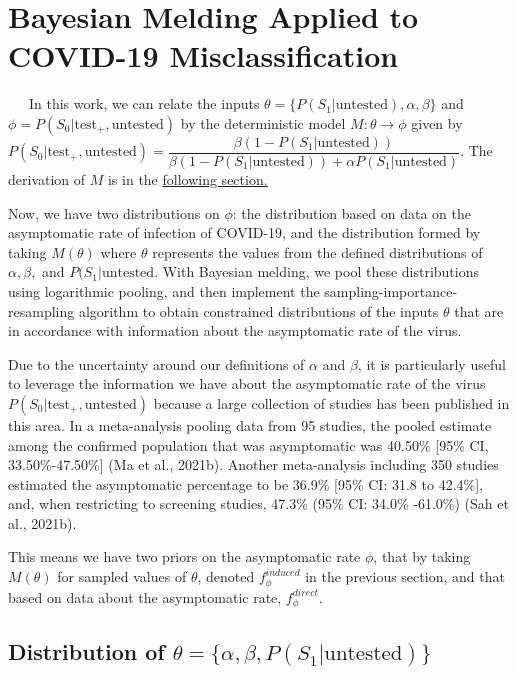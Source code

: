 \documentclass[12pt,twoside]{smiththesis}
\begin{document}
\hypertarget{meld}{%
\section{Bayesian Melding Applied to COVID-19 Misclassification}\label{meld}}

~~~In this work, we can relate the inputs \(\theta = \{P(S_1|\text{untested}), \alpha, \beta \}\) and \(\phi = P(S_0|\text{test}_+,\text{untested})\) by the deterministic model \(M: \theta \to \phi\) given by \(P(S_0|\text{test}_+, \text{untested}) = \dfrac{\beta(1 - P(S_1|\text{untested}))}{\beta(1-P(S_1|\text{untested})) + \alpha P(S_1|\text{untested})}.\) The derivation of \(M\) is in the \protect\hyperlink{derivation}{following section.}

Now, we have two distributions on \(\phi\): the distribution based on data on the asymptomatic rate of infection of COVID-19, and the distribution formed by taking \(M(\theta)\) where \(\theta\) represents the values from the defined distributions of \(\alpha,\beta,\) and \(P(S_1|\text{untested}\). With Bayesian melding, we pool these distributions using logarithmic pooling, and then implement the sampling-importance-resampling algorithm to obtain constrained distributions of the inputs \(\theta\) that are in accordance with information about the asymptomatic rate of the virus.

Due to the uncertainty around our definitions of \(\alpha\) and \(\beta\), it is particularly useful to leverage the information we have about the asymptomatic rate of the virus \(P(S_0|\text{test}_+,\text{untested})\) because a large collection of studies has been published in this area. In a meta-analysis pooling data from 95 studies, the pooled estimate among the confirmed population that was asymptomatic was 40.50\% {[}95\% CI, 33.50\%-47.50\%{]} (Ma et al., 2021b). Another meta-analysis including 350 studies estimated the asymptomatic percentage to be 36.9\% {[}95\% CI: 31.8 to 42.4\%{]}, and, when restricting to screening studies, 47.3\% (95\% CI: 34.0\% -61.0\%) (Sah et al., 2021b).

This means we have two priors on the asymptomatic rate \(\phi\), that by taking \(M(\theta)\) for sampled values of \(\theta\), denoted \(f_\phi^{induced}\) in the previous section, and that based on data about the asymptomatic rate, \(f_\phi^{direct}\).

\newpage

\hypertarget{distribution-of-theta-alpha-beta-ps_1textuntested}{%
\subsection{\texorpdfstring{Distribution of \(\theta = \{\alpha, \beta, P(S_1|\text{untested}) \}\)}{Distribution of \textbackslash theta = \textbackslash\{\textbackslash alpha, \textbackslash beta, P(S\_1\textbar\textbackslash text\{untested\}) \textbackslash\}}}\label{distribution-of-theta-alpha-beta-ps_1textuntested}}
\end{document}

